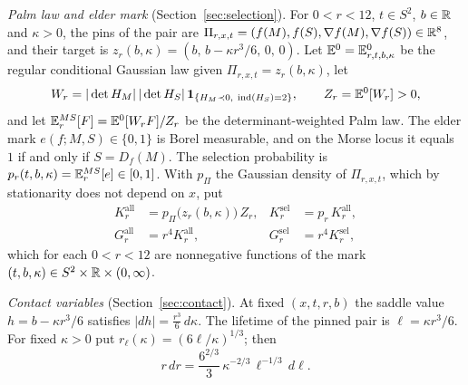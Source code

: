 \emph{Palm law and elder mark} (Section~\ref{sec:selection}). For $0<r<12$, $t\in S^2$, $b\in\mathbb R$ and $\kappa>0$, the pins of the pair are $\Pi_{r,x,t}=(f(M),f(S),\nabla f(M),\nabla f(S))\in\mathbb R^8$, and their target is $z_r(b,\kappa)=(b,\,b-\kappa r^3/6,\,0,\,0)$. Let $\mathbb E^0=\mathbb E^0_{r,t,b,\kappa}$ be the regular conditional Gaussian law given $\Pi_{r,x,t}=z_r(b,\kappa)$, let
\[
W_r=|\det H_M|\,|\det H_S|\,\mathbf 1_{\{H_M\prec0,\ \operatorname{ind}(H_S)=2\}},\qquad Z_r=\mathbb E^0[W_r]>0,
\]
and let $\mathbb E^{MS}_r[F]=\mathbb E^0[W_rF]/Z_r$ be the determinant-weighted Palm law. The elder mark $e(f;M,S)\in\{0,1\}$ is Borel measurable, and on the Morse locus it equals $1$ if and only if $S=D_f(M)$. The selection probability is $p_r(t,b,\kappa)=\mathbb E^{MS}_r[e]\in[0,1]$. With $p_\Pi$ the Gaussian density of $\Pi_{r,x,t}$, which by stationarity does not depend on $x$, put
\begin{equation}\label{eq:limit-K}
\begin{aligned}
K^{\mathrm{all}}_r&=p_\Pi\bigl(z_r(b,\kappa)\bigr)\,Z_r, & K^{\mathrm{sel}}_r&=p_r\,K^{\mathrm{all}}_r,\\
G^{\mathrm{all}}_r&=r^4K^{\mathrm{all}}_r, & G^{\mathrm{sel}}_r&=r^4K^{\mathrm{sel}}_r,
\end{aligned}
\end{equation}
which for each $0<r<12$ are nonnegative functions of the mark $(t,b,\kappa)\in S^2\times\mathbb R\times(0,\infty)$.

\emph{Contact variables} (Section~\ref{sec:contact}). At fixed $(x,t,r,b)$ the saddle value $h=b-\kappa r^3/6$ satisfies $|dh|=\frac{r^3}{6}\,d\kappa$. The lifetime of the pinned pair is $\ell=\kappa r^3/6$. For fixed $\kappa>0$ put $r_\ell(\kappa)=(6\ell/\kappa)^{1/3}$; then
\begin{equation}\label{eq:limit-pushforward}
r\,dr=\frac{6^{2/3}}{3}\,\kappa^{-2/3}\,\ell^{-1/3}\,d\ell .
\end{equation}

